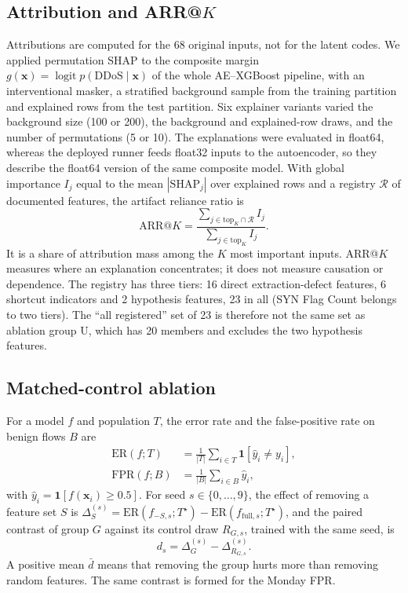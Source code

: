 \documentclass[journal]{IEEEtran}
\newcommand{\Tstar}{T^{\star}}
\newcommand{\ER}{\mathrm{ER}}
\newcommand{\FPR}{\mathrm{FPR}}
\begin{document}
\subsection{Attribution and ARR@\texorpdfstring{$K$}{K}}
Attributions are computed for the 68 original inputs, not for the latent codes. We applied
permutation SHAP to the composite margin $g(\mathbf{x})=\operatorname{logit}p(\mathrm{DDoS}\mid\mathbf{x})$
of the whole AE--XGBoost pipeline, with an interventional masker, a stratified background sample
from the training partition and explained rows from the test partition. Six explainer variants
varied the background size (100 or 200), the background and explained-row draws, and the number
of permutations (5 or 10). The explanations were evaluated in float64, whereas the deployed
runner feeds float32 inputs to the autoencoder, so they describe the float64 version of the same
composite model. With global importance $I_j$ equal to the mean $|\mathrm{SHAP}_j|$ over explained
rows and a registry $\mathcal{R}$ of documented features, the artifact reliance ratio is
\begin{equation}
\mathrm{ARR@}K=\frac{\sum_{j\in\mathrm{top}_K\cap\mathcal{R}} I_j}{\sum_{j\in\mathrm{top}_K} I_j}.
\label{eq:arr}
\end{equation}
It is a share of attribution mass among the $K$ most important inputs. ARR@$K$ measures where an
explanation concentrates; it does not measure causation or dependence. The registry has three
tiers: 16 direct extraction-defect features, 6 shortcut indicators and 2 hypothesis features, 23
in all (SYN Flag Count belongs to two tiers). The ``all registered'' set of 23 is therefore not the
same set as ablation group U, which has 20 members and excludes the two hypothesis features.

\subsection{Matched-control ablation}
For a model $f$ and population $T$, the error rate and the false-positive rate on benign flows
$B$ are
\begin{align}
\ER(f;T)&=\frac{1}{|T|}\sum_{i\in T}\mathbf{1}[\hat y_i\ne y_i],\label{eq:er}\\
\FPR(f;B)&=\frac{1}{|B|}\sum_{i\in B}\hat y_i,\label{eq:fpr}
\end{align}
with $\hat y_i=\mathbf{1}[f(\mathbf{x}_i)\ge0.5]$. For seed $s\in\{0,\dots,9\}$, the effect of
removing a feature set $S$ is
$\Delta_S^{(s)}=\ER(f_{-S,s};\Tstar)-\ER(f_{\mathrm{full},s};\Tstar)$, and the paired contrast of
group $G$ against its control draw $R_{G,s}$, trained with the same seed, is
\begin{equation}
d_s=\Delta_G^{(s)}-\Delta_{R_{G,s}}^{(s)}.
\label{eq:d}
\end{equation}
A positive mean $\bar d$ means that removing the group hurts more than removing random features.
The same contrast is formed for the Monday FPR.
\end{document}
